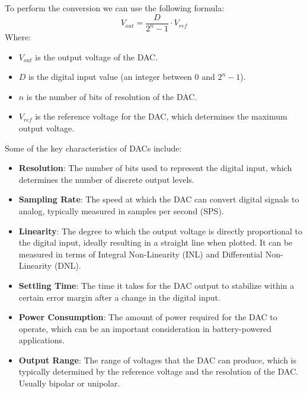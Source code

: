 To perform the conversion we can use the following formula:
\begin{equation}
    V_{out} = \frac{D}{2^n-1} \cdot V_{ref}
\end{equation}
Where:
\begin{itemize}
    \item $V_{out}$ is the output voltage of the DAC.
    \item $D$ is the digital input value (an integer between 0 and $2^n-1$).
    \item $n$ is the number of bits of resolution of the DAC.
    \item $V_{ref}$ is the reference voltage for the DAC, which determines the
          maximum output voltage.
\end{itemize}
Some of the key characteristics of DACs include:
\begin{itemize}
    \item \textbf{Resolution}: The number of bits used to represent the digital
          input, which determines the number of discrete output levels.
    \item \textbf{Sampling Rate}: The speed at which the DAC can convert digital
          signals to analog, typically measured in samples per second (SPS).
    \item \textbf{Linearity}: The degree to which the output voltage is directly
          proportional to the digital input, ideally resulting in a straight
          line when plotted. It can be measured in terms of Integral
          Non-Linearity (INL) and Differential Non-Linearity (DNL).
    \item \textbf{Settling Time}: The time it takes for the DAC output to
          stabilize within a certain error margin after a change in the digital
          input.
    \item \textbf{Power Consumption}: The amount of power required for the DAC
          to operate, which can be an important consideration in battery-powered
          applications.
    \item \textbf{Output Range}: The range of voltages that the DAC can produce,
          which is typically determined by the reference voltage and the
          resolution of the DAC. Usually bipolar or unipolar.
\end{itemize}
